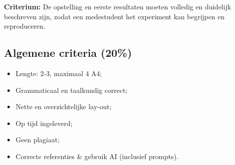 \documentclass[a4paper,11pt]{article}
\begin{document}
\textbf{Criterium:} De opstelling en eerste resultaten moeten volledig en duidelijk beschreven zijn, zodat een medestudent het experiment kan begrijpen en reproduceren.

\subsection*{Algemene criteria \textbf{(20\%)}}
\begin{itemize}[leftmargin=1.5cm, partopsep=1pt, itemsep=2pt, parsep=0pt]
    \item Lengte: 2-3, maximaal 4 A4;
    \item Grammaticaal en taalkundig correct;
    \item Nette en overzichtelijke lay-out;
    \item Op tijd ingeleverd;
    \item Geen plagiaat;
    \item Correcte referenties \& gebruik AI (inclusief prompts).
\end{itemize}
\end{document}
